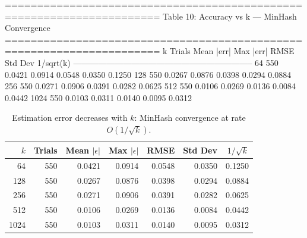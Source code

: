 ======================================================================
  Table 10: Accuracy vs k — MinHash Convergence
======================================================================
     k  Trials  Mean |err|  Max |err|    RMSE  Std Dev  1/sqrt(k)
-----------------------------------------------------------------
    64     550      0.0421     0.0914  0.0548   0.0350     0.1250
   128     550      0.0267     0.0876  0.0398   0.0294     0.0884
   256     550      0.0271     0.0906  0.0391   0.0282     0.0625
   512     550      0.0106     0.0269  0.0136   0.0084     0.0442
  1024     550      0.0103     0.0311  0.0140   0.0095     0.0312

\begin{table}[t]
\centering
\caption{Estimation error decreases with $k$: MinHash convergence at rate $O(1/\sqrt{k})$.}
\label{tab:accuracy-vs-k}
\begin{tabular}{rrrrrrr}
\toprule
$k$ & Trials & Mean $|\epsilon|$ & Max $|\epsilon|$ & RMSE & Std Dev & $1/\sqrt{k}$ \\
\midrule
64 & 550 & 0.0421 & 0.0914 & 0.0548 & 0.0350 & 0.1250 \\
128 & 550 & 0.0267 & 0.0876 & 0.0398 & 0.0294 & 0.0884 \\
256 & 550 & 0.0271 & 0.0906 & 0.0391 & 0.0282 & 0.0625 \\
512 & 550 & 0.0106 & 0.0269 & 0.0136 & 0.0084 & 0.0442 \\
1024 & 550 & 0.0103 & 0.0311 & 0.0140 & 0.0095 & 0.0312 \\
\bottomrule
\end{tabular}
\end{table}


